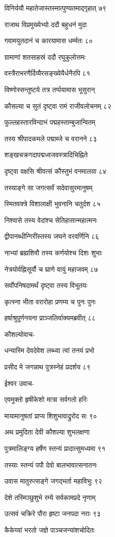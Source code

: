विनिर्ययौ महातेजास्तस्मात्पुण्यतमाद्गृहात् ७९

राजाथ विप्रमुख्येभ्यो ददौ बहुधनं मुदा

गवामयुतदानं च कारयामास धर्म्मतः ८०

ग्रामाणां शतसाहस्रं ददौ रघुकुलोत्तमः

वस्त्रैराभरणैर्दिव्यैरसङ्ख्येयैर्धनैरपि ८१

विष्णोस्सन्तुष्टये तत्र तर्प्पयामास भूसुरान्

कौसल्या च सुतं दृष्ट्वा रामं राजीवलोचनम् ८२

फुल्लहस्तारविन्दाभं पद्महस्ताम्बुजान्वितम्

तस्य श्रीपादकमले पद्माब्जे च वरानने ८३

शङ्खचक्रगदापद्मध्वजवस्त्रादिचिह्निते

दृष्ट्वा वक्षसि श्रीवत्सं कौस्तुभं वनमालया ८४

तस्याङ्गे सा जगत्सर्वं सदेवासुरमानुषम्

स्मितवक्त्रे विशालाक्षी भुवनानि चतुर्दश ८५

निश्वासे तस्य वेदांश्च सेतिहासान्महात्मनः

द्वीपानब्धीन्गिरींस्तस्य जघने वरवर्णिनि ८६

नाभ्यां ब्रह्मशिवौ तस्य कर्णयोश्च दिशः शुभाः

नेत्रयोर्वह्निसूर्यौ च घ्राणे वायुं महाजवम् ८७

सर्वोपनिषदामर्थं दृष्ट्वा तस्य विभूतयः

कृत्स्ना भीता वरारोहा प्रणम्य च पुनः पुनः

हर्षाश्रुपूर्णनयना प्राञ्जलिर्वाक्यमब्रवीत् ८८

कौशल्योवाच-

धन्यास्मि देवदेवेश लब्ध्वा त्वां तनयं प्रभो

प्रसीद मे जगन्नाथ पुत्रस्नेहं प्रदर्शय ८९

ईश्वर उवाच-

एवमुक्तो हृषीकेशो मात्रा सर्वगतो हरिः

मायामानुषतां प्राप्य शिशुभावाद्रुरोद सः ९०

अथ प्रमुदिता देवी कौशल्या शुभलक्षणा

पुत्रमालिङ्ग्य हर्षेण स्तन्यं प्रादात्सुमध्यमा ९१

तस्याः स्तन्यं पपौ देवो बालभावात्सनातनः

उवास मातुरुत्सङ्गे जगद्भर्ता महाविभुः ९२

देशे तस्मिञ्छुशुभे रम्ये सर्वकामप्रदे नृणाम्

उत्सवं चक्रिरे पौरा हृष्टा जनपदा नराः ९३

कैकेय्यां भरतो जज्ञे पाञ्चजन्यांशचोदितः

